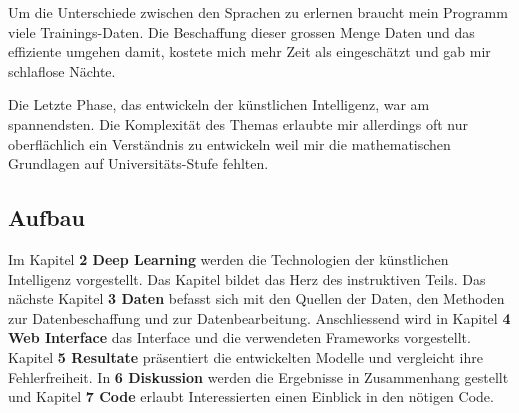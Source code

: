 Um die Unterschiede zwischen den Sprachen zu erlernen braucht mein Programm viele Trainings-Daten. Die Beschaffung dieser grossen Menge Daten und das effiziente umgehen
damit, kostete mich mehr Zeit als eingeschätzt und gab mir schlaflose Nächte.

Die Letzte Phase, das entwickeln der künstlichen Intelligenz, war am spannendsten. Die Komplexität des Themas erlaubte mir allerdings oft nur oberflächlich ein Verständnis zu
entwickeln weil mir die mathematischen Grundlagen auf Universitäts-Stufe fehlten.

\subsection{Aufbau}
Im Kapitel \textbf{2 Deep Learning} werden die Technologien der künstlichen Intelligenz vorgestellt. Das Kapitel bildet das Herz des instruktiven Teils. Das nächste Kapitel \textbf{3
Daten} befasst sich mit den Quellen der Daten, den Methoden zur Datenbeschaffung und zur Datenbearbeitung. Anschliessend wird in Kapitel \textbf{4 Web Interface} das Interface und
die verwendeten Frameworks vorgestellt. Kapitel \textbf{5 Resultate} präsentiert die entwickelten Modelle und vergleicht ihre Fehlerfreiheit. In \textbf{6 Diskussion} werden die
Ergebnisse in Zusammenhang gestellt und Kapitel \textbf{7 Code} erlaubt Interessierten einen Einblick in den nötigen Code.
